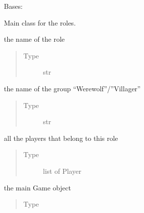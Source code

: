 \documentclass[letterpaper,10pt,english]{sphinxmanual}
\begin{document}
\begin{fulllineitems}
Bases: 

Main class for the roles.


\begin{fulllineitems}
the name of the role
\begin{quote}\begin{description}
\item[{Type}] \leavevmode
str

\end{description}\end{quote}

\end{fulllineitems}



\begin{fulllineitems}
the name of the group “Werewolf”/”Villager”
\begin{quote}\begin{description}
\item[{Type}] \leavevmode
str

\end{description}\end{quote}

\end{fulllineitems}



\begin{fulllineitems}
all the players that belong to this role
\begin{quote}\begin{description}
\item[{Type}] \leavevmode
list of Player

\end{description}\end{quote}

\end{fulllineitems}



\begin{fulllineitems}
the main Game object
\begin{quote}\begin{description}
\item[{Type}] \leavevmode
{\hyperref[\detokenize{chatwolf:chatwolf.game.Game}]{}}


\end{description}
\end{quote}
\end{fulllineitems}
\end{fulllineitems}
\end{document}
